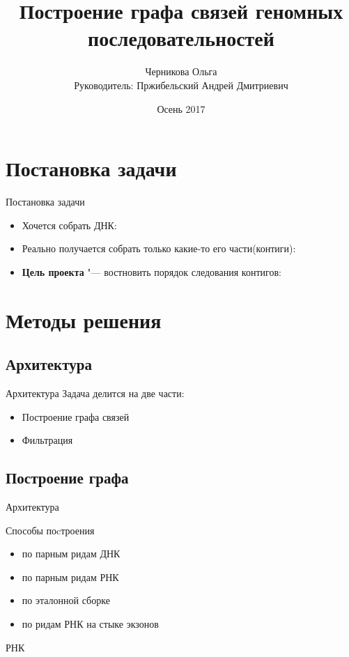 \documentclass{beamer}
\title[Граф связей между контигами]{Построение графа связей геномных последовательностей}
\author[Черникова Ольга]{Черникова Ольга\\
	Руководитель: Пржибельский Андрей Дмитриевич}
\institute{СПб АУ РАН}
\date{Осень 2017}
\newcommand{\cimg}[2]{%
	\begin{center}%
		\ifthenelse{\equal{#2}{}}{%
			\texttt{[image: \#1]}
		}{%
			\texttt{[image: \#1]}
		}%
	\end{center}%
}
\begin{document}
\begin{frame}
	\titlepage
\end{frame}

\section{Постановка задачи}

\begin{frame}[t]{Постановка задачи}
	\begin{itemize}
		\item Хочется собрать ДНК:
		\cimg{p1_1.png}{1}
		\item Реально получается собрать только какие-то его части(контиги):
		\cimg{p1_2.png}{0.25}
		\item \textbf{Цель проекта} "--- востновить порядок следования контигов:
		\cimg{p1_3.png}{1} 
	\end{itemize}
\end{frame}

\section{Методы решения}
\subsection{Архитектура}
\begin{frame}[t]{Архитектура}
Задача делится на две части:
\begin{itemize}
\item Построение графа связей
\item Фильтрация
\end{itemize}	
\cimg{src.jpg}{0.65}
\end{frame}
\subsection{Построение графа}
\begin{frame}[t]{Архитектура}
\cimg{BuilderClassDiagram.jpg}{1}	
\end{frame}
\begin{frame}[t]{Способы поcтроения}
\begin{itemize}
	\item по парным ридам ДНК
	\item по парным ридам РНК
	\item по эталонной сборке
	\item по ридам РНК на стыке экзонов
\end{itemize}
\end{frame}
\begin{frame}[t]{РНК}
\end{frame}
\end{document}
